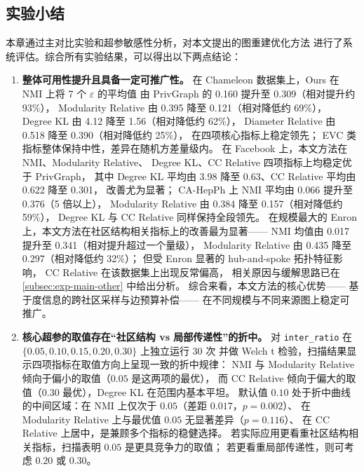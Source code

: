 \subsection{实验小结}
\label{subsec:exp-summary}

\par 本章通过主对比实验和超参敏感性分析，对本文提出的图重建优化方法
进行了系统评估。综合所有实验结果，可以得出以下两点结论：

\begin{enumerate}
    \item \textbf{整体可用性提升且具备一定可推广性。}
    在 Chameleon 数据集上，Ours 在 NMI 上将 7 个 $\varepsilon$ 的平均值
    由 PrivGraph 的 0.160 提升至 0.309（相对提升约 93\%），
    Modularity Relative 由 0.395 降至 0.121（相对降低约 69\%），
    Degree KL 由 4.12 降至 1.56（相对降低约 62\%），
    Diameter Relative 由 0.518 降至 0.390（相对降低约 25\%），
    在四项核心指标上稳定领先；
    EVC 类指标整体保持中性，差异在随机方差量级内。
    在 Facebook 上，本文方法在 NMI、Modularity Relative、
    Degree KL、CC Relative 四项指标上均稳定优于 PrivGraph，
    其中 Degree KL 平均由 3.98 降至 0.63、CC Relative 平均由 0.622 降至 0.301，
    改善尤为显著；
    CA-HepPh 上 NMI 平均由 0.066 提升至 0.376（5 倍以上），
    Modularity Relative 由 0.384 降至 0.157（相对降低约 59\%），
    Degree KL 与 CC Relative 同样保持全段领先。
    在规模最大的 Enron 上，本文方法在社区结构相关指标上的改善最为显著——
    NMI 均值由 0.017 提升至 0.341（相对提升超过一个量级），
    Modularity Relative 由 0.435 降至 0.297（相对降低约 32\%）；
    但受 Enron 显著的 hub-and-spoke 拓扑特征影响，
    CC Relative 在该数据集上出现反常偏高，
    相关原因与缓解思路已在 \autoref{subsec:exp-main-other} 中给出分析。
    综合来看，本文方法的核心优势——
    基于度信息的跨社区采样与边预算补偿——
    在不同规模与不同来源图上稳定可推广。

    \item \textbf{核心超参的取值存在``社区结构 vs 局部传递性''的折中。}
    对 \texttt{inter\_ratio} 在 $\{0.05, 0.10, 0.15, 0.20, 0.30\}$ 上独立运行 30 次
    并做 Welch t 检验，扫描结果显示四项指标在取值方向上呈现一致的折中规律：
    NMI 与 Modularity Relative 倾向于偏小的取值（$0.05$ 是这两项的最优），
    而 CC Relative 倾向于偏大的取值（$0.30$ 最优），Degree KL 在范围内基本平坦。
    默认值 $0.10$ 处于折中曲线的中间区域：在 NMI 上仅次于 $0.05$（差距 $0.017$，$p = 0.002$）、
    在 Modularity Relative 上与最优值 $0.05$ 无显著差异（$p = 0.116$）、
    在 CC Relative 上居中，是兼顾多个指标的稳健选择。
    若实际应用更看重社区结构相关指标，扫描表明 $0.05$ 是更具竞争力的取值；
    若更看重局部传递性，则可考虑 $0.20$ 或 $0.30$。
\end{enumerate}

